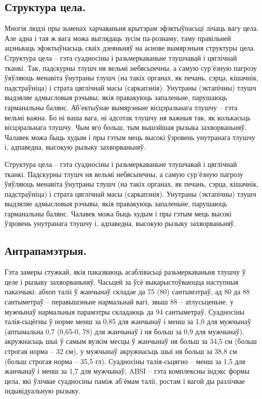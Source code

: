 \subsection{Структура цела.}
Многія людзі пры зьменах харчаваньня крытэрам эфэктыўнасьці лічаць вагу цела. Але адна і тая ж вага можа выглядаць зусім па-рознаму, таму правільней ацэньваць эфэктыўнасьць сваіх дзеяньняў на аснове вымярэньня структуры цела. Структура цела – гэта суадносіны і разьмеркаваньне тлушчавай і цяглічнай тканкі. Так, падскурны тлушч ня вельмі небясьпечны, а самую сур'ёзную пагрозу ўяўляюць менавіта ўнутраны тлушч (на такіх органах, як печань, сэрца, кішачнік, падстраўніца) і страта цяглічнай масы (саркапэнія). Унутраны (эктапічны) тлушч выдзяляе адмысловыя рэчывы, якія правакуюць запаленьне, парушаюць гарманальны балянс. Аб'ектыўнае вымярэньне вісцэральнага тлушчу – гэта вельмі важна. Бо ні ваша вага, ні адсотак тлушчу ня важныя так, як колькасьць вісцэральнага тлушчу. Чым яго больш, тым вышэйшая рызыка захворваньняў. Чалавек можа быць худым і пры гэтым мець высокі ўзровень унутранага тлушчу і, адпаведна, высокую рызыку захворваньняў.

Структура цела – гэта суадносіны і разьмеркаваньне тлушчавай і цяглічнай тканкі. Падскурны тлушч ня вельмі небясьпечны, а самую сур'ёзную пагрозу ўяўляюць менавіта ўнутраны тлушч (на такіх органах, як печань, сэрца, кішачнік, падстраўніца) і страта цяглічнай масы (саркапэнія). Унутраны (эктапічны) тлушч выдзяляе адмысловыя рэчывы, якія правакуюць запаленьне, парушаюць гарманальны балянс. Чалавек можа быць худым і пры гэтым мець высокі ўзровень унутранага тлушчу і, адпаведна, высокую рызыку захворваньняў.

\subsection{Антрапамэтрыя.}
Гэта замеры стужкай, якія паказваюць асаблівасьці разьмеркаваньня тлушчу ў целе і рызыку захворваньняў. Часьцей за ўсё выкарыстоўваюцца наступныя паказчыкі: абхоп таліі ў жанчынаў складае да 75 (80) сантымэтраў, ад 80 да 88 сантыметраў – перавышэньне нармальнай вагі, звыш 88 – атлусьценьне, у мужчынаў нармальныя парамэтры складаюць да 94 сантыметраў. Суадносіны талія-сьцёгны ў норме менш за 0,85 для жанчынаў і менш за 1,0 для мужчынаў (аптымальна 0,7 (0,65-0, 78) для жанчынаў і ня больш за 0,9 для мужчынаў), акружнасьць шыі ў самым вузкім месцы ў жанчынаў ня больш за 34,5 см (больш строгая норма – 32 см), у мужчынаў акружнасьць шыі ня больш за 38,8 см (больш строгая норма – 35,5 гл). Суадносіны талія-сьцягно – менш за 1,5 для жанчынаў і менш за 1,7 для мужчынаў, ABSI – гэта комплексны індэкс формы цела, які ўлічвае суадносіны паміж аб'ёмам таліі, ростам і вагой ды разлічвае індывідуальную рызыку.

